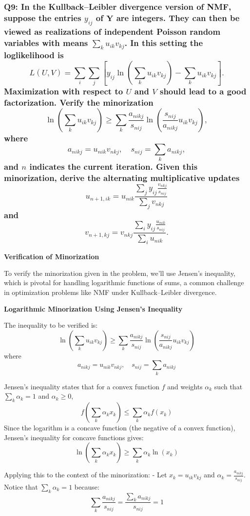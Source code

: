 \documentclass[8pt]{article}
\begin{document}
\subsubsection*{Q9: In the Kullback–Leibler divergence version of NMF, suppose the entries \(y_{ij}\) of \(\mathbf{Y}\) are integers. They can then be viewed as realizations of independent Poisson random variables with means \(\sum_k u_{ik}v_{kj}\). In this setting the loglikelihood is
\[
L(U, V) = \sum_i \sum_j \left[ y_{ij} \ln \left( \sum_k u_{ik}v_{kj} \right) - \sum_k u_{ik}v_{kj} \right].
\]
\noindent Maximization with respect to \(U\) and \(V\) should lead to a good factorization. Verify the minorization
\[
\ln \left( \sum_k u_{ik}v_{kj} \right) \geq \sum_k \frac{a_{nikj}}{s_{nij}} \ln \left( \frac{s_{nij}}{a_{nikj}} u_{ik}v_{kj} \right),
\]
\noindent where
\[
a_{nikj} = u_{nik}v_{nkj}, \quad s_{nij} = \sum_k a_{nikj},
\]
\noindent and \(n\) indicates the current iteration. Given this minorization, derive the alternating multiplicative updates
\[
u_{n+1,ik} = u_{nik} \frac{\sum_j y_{ij} \frac{v_{nkj}}{s_{nij}}}{\sum_j v_{nkj}}
\]
\noindent and
\[
v_{n+1,kj} = v_{nkj} \frac{\sum_i y_{ij} \frac{u_{nik}}{s_{nij}}}{\sum_i u_{nik}}.
\]}

\textbf{Verification of Minorization}

To verify the minorization given in the problem, we'll use Jensen's inequality, which is pivotal for handling logarithmic functions of sums, a common challenge in optimization problems like NMF under Kullback–Leibler divergence.

\textbf{Logarithmic Minorization Using Jensen's Inequality}

The inequality to be verified is:
\[
\ln \left( \sum_k u_{ik}v_{kj} \right) \geq \sum_k \frac{a_{nikj}}{s_{nij}} \ln \left( \frac{s_{nij}}{a_{nikj}} u_{ik}v_{kj} \right)
\]
where
\[
a_{nikj} = u_{nik}v_{nkj}, \quad s_{nij} = \sum_k a_{nikj}
\]

Jensen's inequality states that for a convex function \( f \) and weights \( \alpha_k \) such that \( \sum_k \alpha_k = 1 \) and \( \alpha_k \geq 0 \),
\[
f\left(\sum_k \alpha_k x_k\right) \leq \sum_k \alpha_k f(x_k)
\]
Since the logarithm is a concave function (the negative of a convex function), Jensen's inequality for concave functions gives:
\[
\ln\left(\sum_k \alpha_k x_k\right) \geq \sum_k \alpha_k \ln(x_k)
\]

Applying this to the context of the minorization:
- Let \( x_k = u_{ik}v_{kj} \) and \( \alpha_k = \frac{a_{nikj}}{s_{nij}} \). Notice that \( \sum_k \alpha_k = 1 \) because:
\[
\sum_k \frac{a_{nikj}}{s_{nij}} = \frac{\sum_k a_{nikj}}{s_{nij}} = 1
\]
\end{document}
